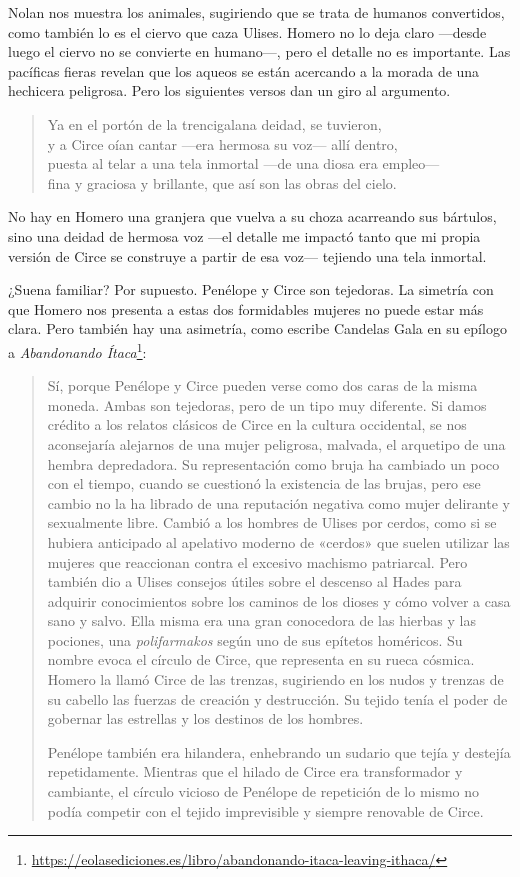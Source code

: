Nolan nos muestra los animales, sugiriendo que se trata de humanos convertidos, como también lo es el ciervo que caza Ulises. Homero no lo deja claro ---desde luego el ciervo no se convierte en humano---, pero el detalle no es importante. Las pacíficas fieras revelan que los aqueos se están acercando a la morada de una hechicera peligrosa. Pero los siguientes versos dan un giro al argumento.

\begin{verse}
Ya en el portón de la trencigalana deidad, se tuvieron,\\
y a Circe oían cantar ---era hermosa su voz--- allí dentro,\\
puesta al telar a una tela inmortal ---de una diosa era empleo---\\
fina y graciosa y brillante, que así son las obras del cielo.
\end{verse}

No hay en Homero una granjera que vuelva a su choza acarreando sus bártulos, sino una deidad de hermosa voz ---el detalle me impactó tanto que mi propia versión de Circe se construye a partir de esa voz--- tejiendo una tela inmortal.

¿Suena familiar? Por supuesto. Penélope y Circe son tejedoras. La simetría con que Homero nos presenta a estas dos formidables mujeres no puede estar más clara. Pero también hay una asimetría, como escribe Candelas Gala en su epílogo a \emph{Abandonando Ítaca}\footnote{\url{https://eolasediciones.es/libro/abandonando-itaca-leaving-ithaca/}}:

\begin{quotation}
Sí, porque Penélope y Circe pueden verse como dos caras de la misma moneda. Ambas son tejedoras, pero de un tipo muy diferente. Si damos crédito a los relatos clásicos de Circe en la cultura occidental, se nos aconsejaría alejarnos de una mujer peligrosa, malvada, el arquetipo de una hembra depredadora. Su representación como bruja ha cambiado un poco con el tiempo, cuando se cuestionó la existencia de las brujas, pero ese cambio no la ha librado de una reputación negativa como mujer delirante y sexualmente libre. Cambió a los hombres de Ulises por cerdos, como si se hubiera anticipado al apelativo moderno de «cerdos» que suelen utilizar las mujeres que reaccionan contra el excesivo machismo patriarcal. Pero también dio a Ulises consejos útiles sobre el descenso al Hades para adquirir conocimientos sobre los caminos de los dioses y cómo volver a casa sano y salvo. Ella misma era una gran conocedora de las hierbas y las pociones, una \emph{polifarmakos} según uno de sus epítetos homéricos. Su nombre evoca el círculo de Circe, que representa en su rueca cósmica. Homero la llamó Circe de las trenzas, sugiriendo en los nudos y trenzas de su cabello las fuerzas de creación y destrucción. Su tejido tenía el poder de gobernar las estrellas y los destinos de los hombres.

Penélope también era hilandera, enhebrando un sudario que tejía y destejía repetidamente. Mientras que el hilado de Circe era transformador y cambiante, el círculo vicioso de Penélope de repetición de lo mismo no podía competir con el tejido imprevisible y siempre renovable de Circe.
\end{quotation}

